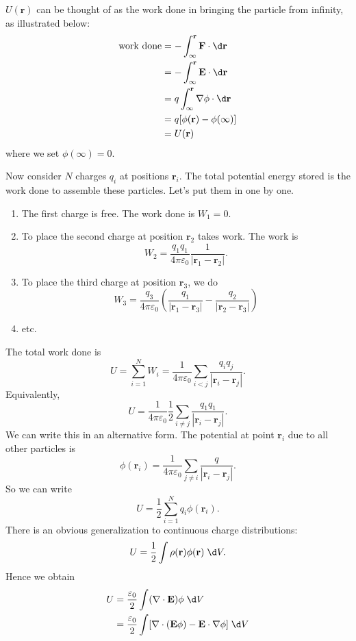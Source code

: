 \documentclass[a4paper]{article}
\begin{document}
$U(\mathbf{r})$ can be thought of as the work done in bringing the particle from infinity, as illustrated below:
\begin{align*}
  \text{work done} &= -\int_\infty^\mathbf{r} \mathbf{F}\cdot \d \mathbf{r}\\
  &= -\int_\infty^\mathbf{r}\mathbf{E}\cdot \d \mathbf{r} \\
  &= q\int_\infty^\mathbf{r} \nabla \mathbf{\phi}\cdot \d \mathbf{r}\\
  &= q[\phi(\mathbf{r}) - \phi(\infty)]\\
  &= U(\mathbf{r})
\end{align*}
where we set $\phi(\infty) = 0$.

Now consider $N$ charges $q_i$ at positions $\mathbf{r}_i$. The total potential energy stored is the work done to assemble these particles. Let's put them in one by one.
\begin{enumerate}
  \item The first charge is free. The work done is $W_1 = 0$.
  \item To place the second charge at position $\mathbf{r}_2$ takes work. The work is
    \[
      W_2 = \frac{q_1q_1}{4\pi\varepsilon_0}\frac{1}{|\mathbf{r}_1 - \mathbf{r}_2|}.
    \]
  \item To place the third charge at position $\mathbf{r}_3$, we do
    \[
      W_3 = \frac{q_3}{4\pi\varepsilon_0}\left(\frac{q_1}{|\mathbf{r}_1 - \mathbf{r}_3|} - \frac{q_2}{|\mathbf{r}_2 - \mathbf{r}_3|}\right)
    \]
  \item etc.
\end{enumerate}
The total work done is
\[
  U = \sum_{i = 1}^N W_i = \frac{1}{4\pi\varepsilon_0} \sum_{i < j} \frac{q_iq_j}{|\mathbf{r}_i - \mathbf{r}_j|}.
\]
Equivalently,
\[
  U = \frac{1}{4\pi\varepsilon_0} \frac{1}{2} \sum_{i \not= j} \frac{q_1q_1}{|\mathbf{r}_i - \mathbf{r}_j|}.
\]
We can write this in an alternative form. The potential at point $\mathbf{r}_i$ due to all other particles is
\[
  \phi(\mathbf{r}_i) = \frac{1}{4\pi\varepsilon_0}\sum_{j\not= i}\frac{q}{|\mathbf{r}_i - \mathbf{r}_j|}.
\]
So we can write
\[
  U = \frac{1}{2}\sum_{i = 1}^N q_i \phi(\mathbf{r}_i).
\]
There is an obvious generalization to continuous charge distributions:
\[
  U = \frac{1}{2} \int \rho (\mathbf{r}) \phi(\mathbf{r}) \;\d V.
\]
Hence we obtain
\begin{align*}
  U &= \frac{\varepsilon_0}{2}\int (\nabla\cdot \mathbf{E}) \phi \;\d V\\
  &= \frac{\varepsilon_0}{2}\int [\nabla\cdot (\mathbf{E}\phi) - \mathbf{E}\cdot \nabla \phi]\;\d V
\end{align*}
\end{document}
